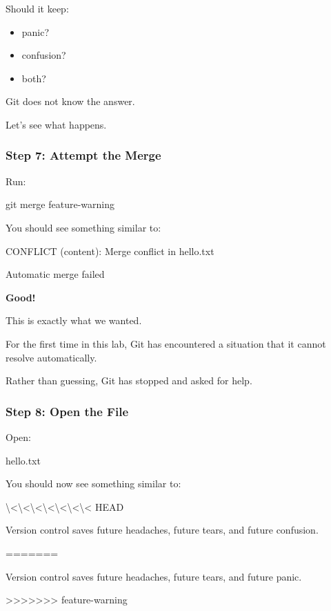 \documentclass{csc2059practical}
\begin{document}
Should it keep:

\begin{itemize}
  \item panic?
  \item confusion?
  \item both?
\end{itemize}
Git does not know the answer.

Let's see what happens.

\subsubsection{Step 7: Attempt the Merge}
Run:

\begin{terminalplain}
git merge feature-warning
\end{terminalplain}
You should see something similar to:

\begin{terminalplain}
CONFLICT (content): Merge conflict in hello.txt
\end{terminalplain}
\begin{terminalplain}
Automatic merge failed
\end{terminalplain}
\begin{importantnote}
\textbf{Good!}\par
\medskip

This is exactly what we wanted.


For the first time in this lab, Git has encountered a situation that it cannot resolve automatically.


Rather than guessing, Git has stopped and asked for help.


\end{importantnote}
\subsubsection{Step 8: Open the File}
Open:

\begin{terminalplain}
hello.txt
\end{terminalplain}
You should now see something similar to:

\textbackslash{}<\textbackslash{}<\textbackslash{}<\textbackslash{}<\textbackslash{}<\textbackslash{}<\textbackslash{}< HEAD

\begin{terminalplain}
Version control saves future headaches, future tears, and future confusion.
\end{terminalplain}
\begin{terminalplain}
=======
\end{terminalplain}
\begin{terminalplain}
Version control saves future headaches, future tears, and future panic.
\end{terminalplain}
>>>>>>> feature-warning
\end{document}
